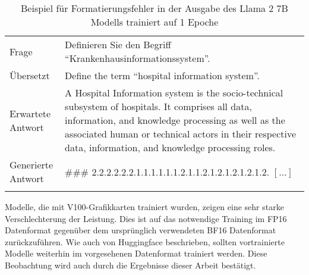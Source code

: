 \begin{table}
    \begin{tabularx}{\textwidth}{lX}
        \toprule
        Frage              & Definieren Sie den Begriff \enquote{Krankenhausinformationssystem}.                                                                                                                                                                                                    \\
        Übersetzt          & Define the term ``hospital information system''.                                                                                                                                                                                                                       \\
        Erwartete Antwort  & A Hospital Information system is the socio-technical subsystem of hospitals. It comprises all data, information, and knowledge processing as well as the associated human or technical actors in their respective data, information, and knowledge processing roles. \\
        Generierte Antwort & \#\#\# 2.2.2.2.2.2.1.1.1.1.1.1.2.1.1.2.1.2.1.2.1.2.1.2. $[\dots]$                                                                                                                                                                                                    \\
        \bottomrule                                                                                                                                                                                                                                                                                 \\
    \end{tabularx}
    \caption[Beispiel für Formatierungsfehler]{Beispiel für Formatierungsfehler in der Ausgabe des Llama 2 7B Modells trainiert auf 1 Epoche}\label{fig:formatting-errors}
\end{table}

Modelle, die mit V100-Grafikkarten trainiert wurden, zeigen eine sehr starke Verschlechterung der Leistung.
Dies ist auf das notwendige Training im FP16 Datenformat gegenüber dem ursprünglich verwendeten BF16 Datenformat zurückzuführen.
Wie auch von Huggingface beschrieben, sollten vortrainierte Modelle weiterhin im vorgesehenen Datenformat trainiert werden.
Diese Beobachtung wird auch durch die Ergebnisse dieser Arbeit bestätigt.\\



